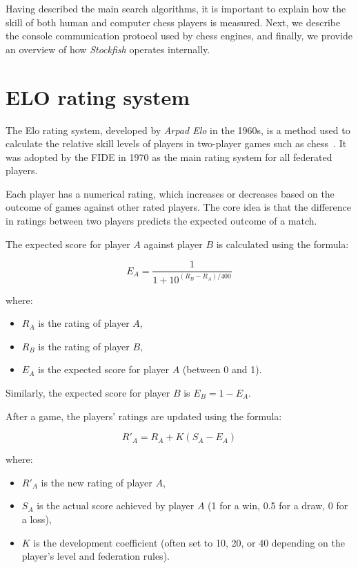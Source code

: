 \newpage

\noindent Having described the main search algorithms, it is important to explain how the skill of both human and computer chess players is measured. Next, we describe the console communication protocol used by chess engines, and finally, we provide an overview of how \textit{Stockfish} operates internally.

\section{ELO rating system}

The Elo rating system, developed by \textit{Arpad Elo} in the 1960s, is a method used to calculate the relative skill levels of players in two-player games such as chess~\cite{Elo}. It was adopted by the FIDE in 1970 as the main rating system for all federated players.

\vspace{1em}

\noindent Each player has a numerical rating, which increases or decreases based on the outcome of games against other rated players. The core idea is that the difference in ratings between two players predicts the expected outcome of a match.

\vspace{1em}

\noindent The expected score for player \( A \) against player \( B \) is calculated using the formula:

\[
E_A = \frac{1}{1 + 10^{(R_B - R_A)/400}}
\]

where:
\begin{itemize}
  \item \( R_A \) is the rating of player \( A \),
  \item \( R_B \) is the rating of player \( B \),
  \item \( E_A \) is the expected score for player \( A \) (between 0 and 1).
\end{itemize}

\noindent Similarly, the expected score for player \( B \) is \( E_B = 1 - E_A \).

\vspace{1em}

\noindent After a game, the players' ratings are updated using the formula:

\[
R'_A = R_A + K (S_A - E_A)
\]

where:
\begin{itemize}
  \item \( R'_A \) is the new rating of player \( A \),
  \item \( S_A \) is the actual score achieved by player \( A \) (1 for a win, 0.5 for a draw, 0 for a loss),
  \item \( K \) is the development coefficient (often set to 10, 20, or 40 depending on the player's level and federation rules).
\end{itemize}

